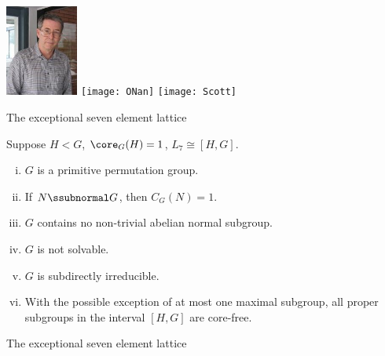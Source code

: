 \begin{frame}[fragile,label=AOS]{}
\begin{center}
\includegraphics[height=30mm]{aux/Aschbacher3}
\hskip2mm
\texttt{[image: ONan]}
\hskip2mm
\texttt{[image: Scott]}
 \end{center}

\end{frame}



\begin{frame}[fragile,label=Example7elementPreziOld,shrink=5]{The exceptional seven element lattice}
    \begin{prop}
      \label{thm:except-seven-elem}
      Suppose $H<G$, \hskip2mm $\core_G(H) = 1$, \hskip2mm $L_7 \cong [H,G]$.
      \begin{enumerate}[(i)]
      \item<1-> $G$ is a primitive permutation group.
      \item<1-> If $N\ssubnormal G$, then $C_G(N) = 1$.
      \item<1-> $G$ contains no non-trivial abelian normal subgroup.
      \item<1-> $G$ is not solvable.
      \item<1-> $G$ is subdirectly irreducible.
      \item<1-> With the possible exception of at most one maximal subgroup, %
        all proper subgroups in the interval $[H,G]$ are core-free. 
      \end{enumerate}
    \end{prop}
\end{frame}


\begin{frame}[fragile,label=Example7elementPreziBigFig]{The exceptional seven element lattice}
      \begin{center}
    {
}
      \end{center}
\end{frame}

